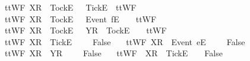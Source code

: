 \begin{isabellebody}
\ \ {\isachardoublequoteopen}ttWF{}\ {\isacharparenleft}{\isacharbrackleft}X{\isacharbrackright}\isactrlsub R\ {\isacharhash}\ {\isacharbrackleft}Tock{\isacharbrackright}\isactrlsub E\ {\isacharhash}\ {\isasymsigma}{\isacharparenright}\ {\isacharbrackleft}{\isacharbrackleft}Tick{\isacharbrackright}\isactrlsub E{\isacharbrackright}\ {\isacharequal}\ ttWF{}\ {\isasymsigma}\ {\isacharbrackleft}{\isacharbrackright}{\isachardoublequoteclose}\ {\isacharbar}\ \isanewline
\ \ {\isachardoublequoteopen}ttWF{}\ {\isacharparenleft}{\isacharbrackleft}X{\isacharbrackright}\isactrlsub R\ {\isacharhash}\ {\isacharbrackleft}Tock{\isacharbrackright}\isactrlsub E\ {\isacharhash}\ {\isasymrho}{\isacharparenright}\ {\isacharparenleft}{\isacharbrackleft}Event\ f{\isacharbrackright}\isactrlsub E\ {\isacharhash}\ {\isasymsigma}{\isacharparenright}\ {\isacharequal}\ ttWF{}\ {\isasymrho}\ {\isasymsigma}{\isachardoublequoteclose}\ {\isacharbar}\ \isanewline
\ \ {\isachardoublequoteopen}ttWF{}\ {\isacharparenleft}{\isacharbrackleft}X{\isacharbrackright}\isactrlsub R\ {\isacharhash}\ {\isacharbrackleft}Tock{\isacharbrackright}\isactrlsub E\ {\isacharhash}\ {\isasymrho}{\isacharparenright}\ {\isacharparenleft}{\isacharbrackleft}Y{\isacharbrackright}\isactrlsub R\ {\isacharhash}\ {\isacharbrackleft}Tock{\isacharbrackright}\isactrlsub E\ {\isacharhash}\ {\isasymsigma}{\isacharparenright}\ {\isacharequal}\ ttWF{}\ {\isasymrho}\ {\isasymsigma}{\isachardoublequoteclose}\ {\isacharbar}\isanewline
\ \ {\isachardoublequoteopen}ttWF{}\ {\isacharparenleft}{\isacharbrackleft}X{\isacharbrackright}\isactrlsub R\ {\isacharhash}\ {\isacharbrackleft}Tick{\isacharbrackright}\isactrlsub E\ {\isacharhash}\ {\isasymrho}{\isacharparenright}\ {\isasymsigma}\ {\isacharequal}\ False{\isachardoublequoteclose}\ {\isacharbar}\isanewline
\ \ {\isachardoublequoteopen}ttWF{}\ {\isacharparenleft}{\isacharbrackleft}X{\isacharbrackright}\isactrlsub R\ {\isacharhash}\ {\isacharbrackleft}Event\ e{\isacharbrackright}\isactrlsub E\ {\isacharhash}\ {\isasymrho}{\isacharparenright}\ {\isasymsigma}\ {\isacharequal}\ False{\isachardoublequoteclose}\ {\isacharbar}\isanewline
\ \ {\isachardoublequoteopen}ttWF{}\ {\isacharparenleft}{\isacharbrackleft}X{\isacharbrackright}\isactrlsub R\ {\isacharhash}\ {\isacharbrackleft}Y{\isacharbrackright}\isactrlsub R\ {\isacharhash}\ {\isasymrho}{\isacharparenright}\ {\isasymsigma}\ {\isacharequal}\ False{\isachardoublequoteclose}\ {\isacharbar}\isanewline
\ \ {\isachardoublequoteopen}ttWF{}\ {\isasymrho}\ {\isacharparenleft}{\isacharbrackleft}X{\isacharbrackright}\isactrlsub R\ {\isacharhash}\ {\isacharbrackleft}Tick{\isacharbrackright}\isactrlsub E\ {\isacharhash}\ {\isasymsigma}{\isacharparenright}\ {\isacharequal}\ False{\isachardoublequoteclose}\ {\isacharbar}\isanewline

\end{isabellebody}
